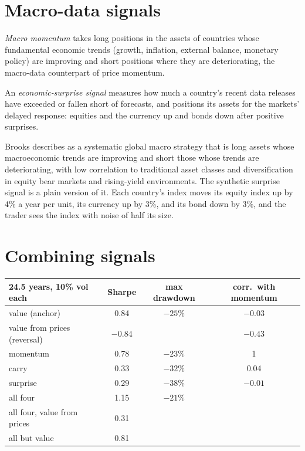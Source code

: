 \section{Macro-data signals}

\begin{definition}\label{def:s2:systematic-macro:momentum}
\emph{Macro momentum} takes long positions in the assets of countries whose fundamental economic trends (growth, inflation,
external balance, monetary policy) are improving and short positions where they are deteriorating, the macro-data counterpart of price momentum.
\end{definition}

\begin{definition}\label{def:s2:systematic-macro:surprise}
An \emph{economic-surprise signal} measures how much a country's recent data releases have exceeded or fallen short
of forecasts, and positions its assets for the markets' delayed response: equities and the currency up and bonds down after positive surprises.
\end{definition}

Brooks describes  as a systematic global macro strategy that is long assets whose macroeconomic trends are improving and short those
whose trends are deteriorating, with low correlation to traditional asset classes and diversification in equity bear markets and rising-yield
environments. The synthetic surprise signal is a plain version of it. Each country's index moves its equity index up by 4\% a year per unit, its
currency up by 3\%, and its bond down by 3\%, and the trader sees the index with noise of half its size.

\section{Combining signals}

\begin{center}
\small
\begin{tabular}{@{}lccc@{}}
\toprule
24.5 years, 10\% vol each & Sharpe & max drawdown & corr.\ with momentum\\
\midrule
value (anchor) & 0.84 & $-25\%$ & $-0.03$\\
value from prices (reversal) & $-0.84$ & & $-0.43$\\
momentum & 0.78 & $-23\%$ & 1\\
carry & 0.33 & $-32\%$ & 0.04\\
surprise & 0.29 & $-38\%$ & $-0.01$\\
\midrule
all four & 1.15 & $-21\%$ &\\
all four, value from prices & 0.31 & &\\
all but value & 0.81 & &\\
\bottomrule
\end{tabular}
\end{center}

